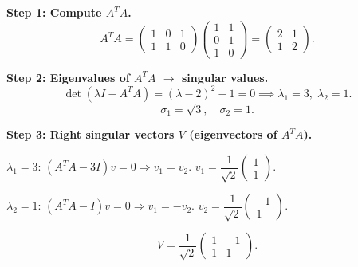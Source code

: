 \documentclass[12pt,a3paper]{article}
\begin{document}
\begin{tcolorbox}[enhanced,breakable,
  colback=cG!4,colframe=cG,boxrule=0.8pt,arc=5pt,
  title={\textbf{Answer --- SVD of $A=\begin{pmatrix}1&1\\0&1\\1&0\end{pmatrix}$}},
  fonttitle=\bfseries\color{white},colbacktitle=cG]
 
\textbf{Step 1: Compute $A^TA$.}
\[
A^TA = \begin{pmatrix}1&0&1\\1&1&0\end{pmatrix}\begin{pmatrix}1&1\\0&1\\1&0\end{pmatrix} = \begin{pmatrix}2&1\\1&2\end{pmatrix}.
\]
 
\textbf{Step 2: Eigenvalues of $A^TA$ $\to$ singular values.}
\[
\det(\lambda I - A^TA) = (\lambda-2)^2-1 = 0 \implies \lambda_1=3,\;\lambda_2=1.
\]
\[
\sigma_1 = \sqrt{3},\quad \sigma_2 = 1.
\]
 
\textbf{Step 3: Right singular vectors $V$ (eigenvectors of $A^TA$).}
 
$\lambda_1=3$: $(A^TA-3I)v=0 \Rightarrow v_1=v_2$.
$v_1=\dfrac{1}{\sqrt{2}}\begin{pmatrix}1\\1\end{pmatrix}$.
 
$\lambda_2=1$: $(A^TA-I)v=0 \Rightarrow v_1=-v_2$.
$v_2=\dfrac{1}{\sqrt{2}}\begin{pmatrix}-1\\1\end{pmatrix}$.
 
\[
V = \frac{1}{\sqrt{2}}\begin{pmatrix}1&-1\\1&1\end{pmatrix}.
\]
 

\end{tcolorbox}
\end{document}
